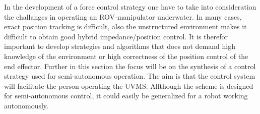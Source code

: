 In the development of a force control strategy one have to take into consideration the challanges in operating an ROV-manipulator underwater. In many cases, exact position tracking is difficult, also the unstructured environment
makes it difficult to obtain good hybrid impedance/position control. It is therefor important to develop strategies and algorithms that does not demand high knowledge of the environment or high correctness of the position control of 
the end effector.
Further in this section the focus will be on the synthesis of a control strategy used for semi-autonomous operation. The aim is that the control system will facilitate the person operating the UVMS. Allthough the scheme is 
designed for semi-autonomous control, it could easily be generalized for a robot working autonomously.   
























